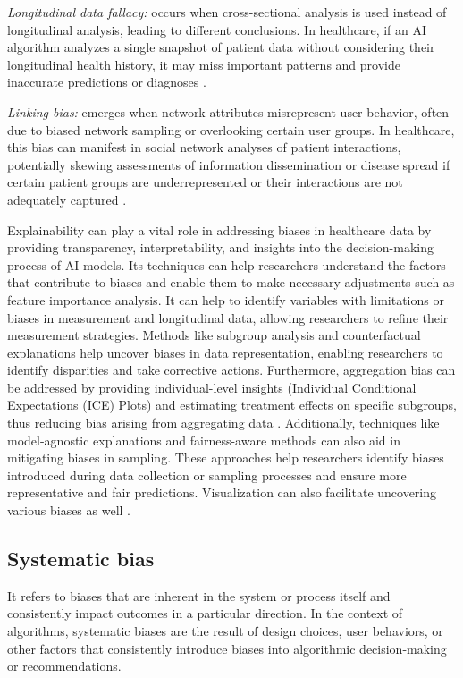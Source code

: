 \documentclass{article}
\begin{document}
\emph{Longitudinal data fallacy:} occurs when cross-sectional analysis is used instead of longitudinal analysis, leading to different conclusions. In healthcare, if an AI algorithm analyzes a single snapshot of patient data without considering their longitudinal health history, it may miss important patterns and provide inaccurate predictions or diagnoses \cite{barbosa2016averaging}.

\emph{Linking bias:} emerges when network attributes misrepresent user behavior, often due to biased network sampling or overlooking certain user groups. In healthcare, this bias can manifest in social network analyses of patient interactions, potentially skewing assessments of information dissemination or disease spread if certain patient groups are underrepresented or their interactions are not adequately captured \cite{barbosa2016averaging}.

Explainability can play a vital role in addressing biases in healthcare data by providing transparency, interpretability, and insights into the decision-making process of AI models. Its techniques can help researchers understand the factors that contribute to biases and enable them to make necessary adjustments such as feature importance analysis. It can help to identify variables with limitations or biases in measurement and longitudinal data, allowing researchers to refine their measurement strategies. Methods like subgroup analysis and counterfactual explanations help uncover biases in data representation, enabling researchers to identify disparities and take corrective actions. Furthermore, aggregation bias can be addressed by providing individual-level insights (Individual Conditional Expectations (ICE) Plots) and estimating treatment effects on specific subgroups, thus reducing bias arising from aggregating data \cite{azodi2020opening}.
Additionally, techniques like model-agnostic explanations and fairness-aware methods can also aid in mitigating biases in sampling. These approaches help researchers identify biases introduced during data collection or sampling processes and ensure more representative and fair predictions. Visualization can also facilitate uncovering various biases as well \cite{das2020opportunities}.

\subsection{Systematic bias}
It refers to biases that are inherent in the system or process itself and consistently impact outcomes in a particular direction. In the context of algorithms, systematic biases are the result of design choices, user behaviors, or other factors that consistently introduce biases into algorithmic decision-making or recommendations.
\end{document}
